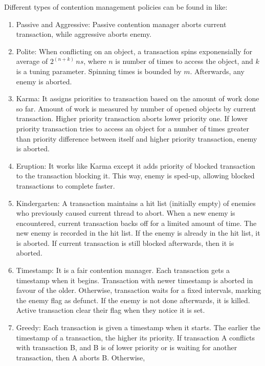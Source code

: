 Different types of contention management policies can be found in
\cite{Scherer:2005:ACM:1073814.1073861,scherer2004contention,Spear:2009:CSC:1504176.1504199,springerlink:10.1007_11561927_23,Guerraoui:2005:TTT:1073814.1073863,Guerraoui:2006:TTT:1146381.1146429}
like:
\begin{enumerate}
\item Passive and Aggressive: Passive contention manager aborts current transaction,
while aggressive aborts enemy.
\item Polite: When conflicting on an object, a transaction spins exponensially
for average of $2^{(n+k)}\, ns$, where $n$ is number of times to
access the object, and $k$ is a tuning parameter. Spinning times
is bounded by $m$. Afterwards, any enemy is aborted.
\item Karma: It assigns priorities to transaction based on the amount of
work done so far. Amount of work is measured by number of opened objects
by current transaction. Higher priority transaction aborts lower priority
one. If lower priority transaction tries to access an object for a
number of times greater than priority difference between itself and
higher priority transaction, enemy is aborted.
\item Eruption: It works like Karma except it adds priority of blocked transaction
to the transaction blocking it. This way, enemy is sped-up, allowing
blocked transactions to complete faster.
\item Kindergarten: A transaction maintains a hit list (initially empty)
of enemies who previously caused current thread to abort. When a new
enemy is encountered, current transaction backs off for a limited
amount of time. The new enemy is recorded in the hit list. If the
enemy is already in the hit list, it is aborted. If current transaction
is still blocked afterwards, then it is aborted.
\item Timestamp: It is a fair contention manager. Each transaction gets
a timestamp when it begins. Transaction with newer timestamp is aborted
in favour of the older. Otherwise, transaction waits for a fixed intervals,
marking the enemy flag as defunct. If the enemy is not done afterwards,
it is killed. Active transaction clear their flag when they notice
it is set.
\item Greedy: Each transaction is given a timestamp when it starts. The
earlier the timestamp of a transaction, the higher its priority. If
transaction A conflicts with transaction B, and B is of lower priority
or is waiting for another transaction, then A aborts B. Otherwise,

\end{enumerate}
